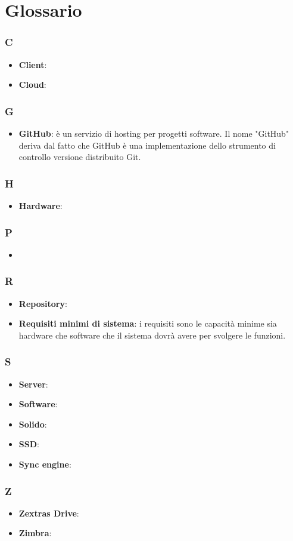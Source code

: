 \appendix

\section{Glossario}

\subsubsection{C}
\begin{itemize}
	\item \textbf{Client}:
	\item \textbf{Cloud}:
\end{itemize}
\subsubsection{G}
\begin{itemize}
	\item \textbf{GitHub}: è un servizio di hosting per progetti software. Il nome "GitHub" deriva dal fatto che
GitHub è una implementazione dello strumento di controllo versione distribuito Git.
\end{itemize}
\subsubsection{H}
\begin{itemize}
	\item \textbf{Hardware}:
\end{itemize}

\subsubsection{P}
\begin{itemize}
	\item 
\end{itemize}

\subsubsection{R}
\begin{itemize}
	\item \textbf{Repository}:
	\item \textbf{Requisiti minimi di sistema}: i requisiti sono le capacità minime sia hardware che software che il sistema dovrà avere per svolgere le funzioni.
\end{itemize}

\subsubsection{S}
\begin{itemize}
	\item \textbf{Server}:
	\item \textbf{Software}: 
	\item \textbf{Solido}:
	\item \textbf{SSD}:
	\item \textbf{Sync engine}:
\end{itemize}

\subsubsection{Z}
\begin{itemize}
	\item \textbf{Zextras Drive}:
	\item \textbf{Zimbra}:
\end{itemize}